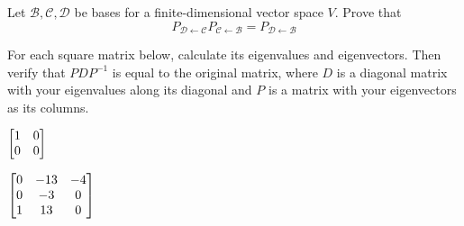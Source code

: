 \documentclass[oneperpage]{gsypset}
\begin{document}
	\begin{problem}[6.3.21]
		Let $\mathcal{B}, \mathcal{C}, \mathcal{D}$ be bases for a finite-dimensional vector space $V$.
		Prove that
		\[
			P_{\mathcal{D} \leftarrow \mathcal{C}} P_{\mathcal{C} \leftarrow \mathcal{B}}
				= P_{\mathcal{D} \leftarrow \mathcal{B}}
		\]
	\end{problem}
	\begin{solution}
		
	\end{solution}
	
	\begin{problem*}
		For each square matrix below, calculate its eigenvalues and eigenvectors.
		Then verify that $PDP^{-1}$ is equal to the original matrix, 
		where $D$ is a diagonal matrix with your eigenvalues along its diagonal
		and $P$ is a matrix with your eigenvectors as its columns.
		\begin{subproblems}[(a)]
			\subproblem $\begin{bmatrix}1&0\\0&0\end{bmatrix}$
			\begin{solution}
				
			\end{solution}
			
			\subproblem $\begin{bmatrix}0 & -13 & -4 \\ 0 & -3 & 0 \\ 1 & 13 & 0\end{bmatrix}$
			\begin{solution}
				
			\end{solution}
		\end{subproblems}
	\end{problem*}
\end{document}
